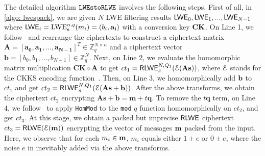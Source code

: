 The detailed algorithm $\texttt{LWEstoRLWE}$ involves the following steps.
First of all, in \cref{algo: lwespack},
we are given $N$ LWE filtering results ${\mathsf{LWE}}_0, {\mathsf{LWE}}_1, ...,{\mathsf{LWE}}_{N-1}$
where ${\mathsf{LWE}}_i = {\rm {LWE}}_{\mathbf{s}}^{n,q}(m_i) = (b_i, \mathbf{a_i})$
with a  conversion key 
${\rm {\mathbf{CK}}}$.
On Line 1, we follow~\cite{pegasus} and rearrange the ciphertexts to 
construct a ciphertext matrix
$\mathbf{A} = [\mathbf{a_0}, \mathbf{a_1}, ..., \mathbf{a_{N-1}}]^{T} 
\in \mathbb{Z}_{q}^{N \times n}$ and a ciphertext vector 
$\mathbf{b} = [b_0, b_1, ...,b_{N-1}] \in \mathbb{Z}_{q}^{N}$.
Next, on Line 2, we evaluate the 
homomorphic matrix multiplication
$\mathbf{CK} \diamond \mathbf{A}$ 
to get $ct_1 = {\mathsf{RLWE}}^{N,Q_1}_{\Tilde{s}}(\mathcal{E}(\mathbf{A}\mathbf{s}))$,
where $\mathcal{E}$ stands for the CKKS encoding 
function~\cite{DBLP:conf/asiacrypt/CheonKKS17}.
Then, on Line 3, we homomorphically add ${\mathbf{b}}$ to $ct_1$ and get $ct_2 = {\mathsf{RLWE}}^{N,Q_1}_{\Tilde{s}}(\mathcal{E}(\mathbf{A}\mathbf{s} + \mathbf{b}))$.
After the above transforms, we obtain the ciphertext $ct_2$
encrypting $\mathbf{A}\mathbf{s}+\mathbf{b} = \mathbf{m} + t\mathbf{q}$.
To remove the $t\mathbf{q}$ term, on Line 4, 
we follow~\cite{ckksbootstrap,ckksbootsparse, ckksbootvariance, sinemod} 
to apply \texttt{HomMod} to the \texttt{mod} $q$ function 
homomorphically on $ct_2$, and get
$ct_3$. %
At this stage, we obtain a packed but imprecise ${\mathsf{RLWE}}$ ciphertext 
$ct_3 = {\mathsf{RLWE}}(\mathcal{E}(\mathbf{m}))$ encrypting
the vector of messages ${\mathbf{m}}$ packed from the input. Here, we observe that for each $m_i\in{\mathbf{m}}$,
$m_i$ equals either $1\pm e$ or $0\pm e$, where the noise $e$ 
in inevitably added via the above transforms.

